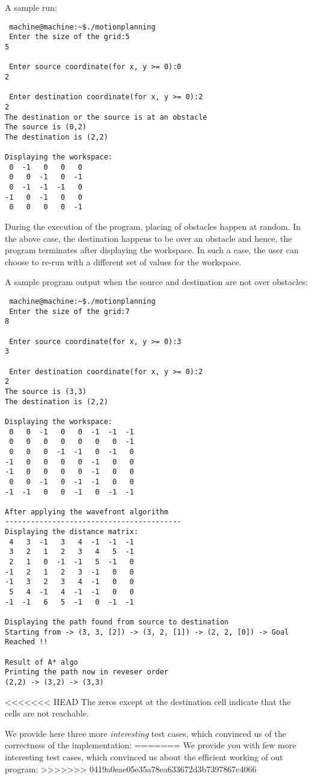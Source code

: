 \documentclass[12pt]{article}
\begin{document}
A sample run:
	\begin{verbatim}
 machine@machine:~$./motionplanning
 Enter the size of the grid:5
5

 Enter source coordinate(for x, y >= 0):0
2

 Enter destination coordinate(for x, y >= 0):2
2
The destination or the source is at an obstacle
The source is (0,2) 
The destination is (2,2) 

Displaying the workspace:
 0	-1	 0	 0	 0	
 0	 0	-1	 0	-1	
 0	-1	-1	-1	 0	
-1	 0	-1	 0	 0	
 0	 0	 0	 0	-1	
	\end{verbatim}
	During the execution of the program, placing of obstacles happen
  at random. In the above case, the destination happens to be over an
  obstacle and hence, the program terminates after displaying the
  workspace. In such a case, the user can choose to re-run with a
  different set of values for the \textsf{workspace}.

A sample program output when the source and destination are not over obstacles:
	
	\begin{verbatim}
 machine@machine:~$./motionplanning
 Enter the size of the grid:7
8

 Enter source coordinate(for x, y >= 0):3
3

 Enter destination coordinate(for x, y >= 0):2
2
The source is (3,3) 
The destination is (2,2) 

Displaying the workspace:
 0	 0	-1	 0	 0	-1	-1	-1	
 0	 0	 0	 0	 0	 0	 0	-1	
 0	 0	 0	-1	-1	 0	-1	 0	
-1	 0	 0	 0	 0	-1	 0	 0	
-1	 0	 0	 0	 0	-1	 0	 0	
 0	 0	-1	 0	-1	-1	 0	 0	
-1	-1	 0	 0	-1	 0	-1	-1	

After applying the wavefront algorithm
-----------------------------------------
Displaying the distance matrix:
 4	 3	-1	 3	 4	-1	-1	-1	
 3	 2	 1	 2	 3	 4	 5	-1	
 2	 1	 0	-1	-1	 5	-1	 0	
-1	 2	 1	 2	 3	-1	 0	 0	
-1	 3	 2	 3	 4	-1	 0	 0	
 5	 4	-1	 4	-1	-1	 0	 0	
-1	-1	 6	 5	-1	 0	-1	-1	

Displaying the path found from source to destination 
Starting from -> (3, 3, [2]) -> (3, 2, [1]) -> (2, 2, [0]) -> Goal Reached !!

Result of A* algo
Printing the path now in reveser order
(2,2) -> (3,2) -> (3,3)
	\end{verbatim}
<<<<<<< HEAD
  The zeros except at the destination cell indicate that the cells are
not reachable.

	We provide here three more \textit{interesting} test cases, which
  convinced us of the correctness of the implementation:
=======
	We provide you with few more \textsf{interesting} test cases, which convinced us about the efficient working of out program:
>>>>>>> 0419a0eae05e35a78ea633672d3b7397867c4066
	
\end{document}
